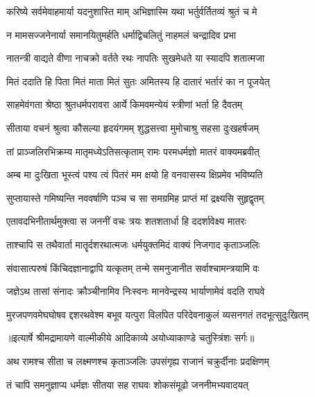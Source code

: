 \twolineshloka
{करिष्ये सर्वमेवाहमार्या यदनुशास्ति माम्}
{अभिज्ञास्मि यथा भर्तुर्वर्तितव्यं श्रुतं च मे} %

\twolineshloka
{न मामसज्जनेनार्या समानयितुमर्हति}
{धर्माद्विचलितुं नाहमलं चन्द्रादिव प्रभा} %

\twolineshloka
{नातन्त्री वाद्यते वीणा नाचक्रो वर्तते रथः}
{नापतिः सुखमेधते या स्यादपि शतात्मजा} %

\twolineshloka
{मितं ददाति हि पिता मितं माता मितं सुतः}
{अमितस्य हि दातारं भर्तारं का न पूजयेत्} %

\twolineshloka
{साहमेवंगता श्रेष्ठा श्रुतधर्मपरावरा}
{आर्ये किमवमन्येयं स्त्रीणां भर्ता हि दैवतम्} %

\twolineshloka
{सीताया वचनं श्रुत्वा कौसल्या हृदयंगमम्}
{शुद्धसत्त्वा मुमोचाश्रु सहसा दुःखहर्षजम्} %

\twolineshloka
{तां प्राञ्जलिरभिक्रम्य मातृमध्येऽतिसत्कृताम्}
{रामः परमधर्मज्ञो मातरं वाक्यमब्रवीत्} %

\twolineshloka
{अम्ब मा दुःखिता भूस्त्वं पश्य त्वं पितरं मम}
{क्षयो हि वनवासस्य क्षिप्रमेव भविष्यति} %

\twolineshloka
{सुप्तायास्ते गमिष्यन्ति नववर्षाणि पञ्च च}
{सा समग्रमिह प्राप्तं मां द्रक्ष्यसि सुहृद्वृतम्} %

\twolineshloka
{एतावदभिनीतार्थमुक्त्वा स जननीं वचः}
{त्रयः शतशतार्धा हि ददर्शावेक्ष्य मातरः} %

\twolineshloka
{ताश्चापि स तथैवार्ता मातॄर्दशरथात्मजः}
{धर्मयुक्तमिदं वाक्यं निजगाद कृताञ्जलिः} %

\twolineshloka
{संवासात्परुषं किंचिदज्ञानाद्वापि यत्कृतम्}
{तन्मे समनुजानीत सर्वाश्चामन्त्रयामि वः} %

\twolineshloka
{जज्ञेऽथ तासां संनादः क्रौञ्चीनामिव निःस्वनः}
{मानवेन्द्रस्य भार्याणामेवं वदति राघवे} %

\fourlineindentedshloka
{मुरजपणवमेघघोषव}
{द्दशरथवेश्म बभूव यत्पुरा}
{विलपित परिदेवनाकुलं}
{ व्यसनगतं तदभूत्सुदुःखितम्} %


{॥इत्यार्षे श्रीमद्रामायणे वाल्मीकीये आदिकाव्ये अयोध्याकाण्डे चतुस्त्रिंशः सर्गः॥}


\twolineshloka
{अथ रामश्च सीता च लक्ष्मणश्च कृताञ्जलिः}
{उपसंगृह्य राजानं चक्रुर्दीनाः प्रदक्षिणम्} %

\twolineshloka
{तं चापि समनुज्ञाप्य धर्मज्ञः सीतया सह}
{राघवः शोकसंमूढो जननीमभ्यवादयत्} %

